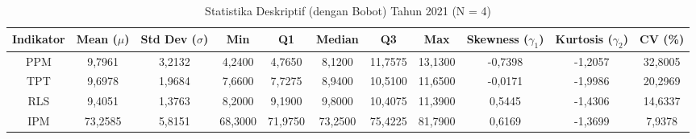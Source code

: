 \begin{table}[H]
\centering
\caption{Statistika Deskriptif (dengan Bobot) Tahun 2021 (N = 4)} \label{tab:sample1desc_2021}
\begin{adjustbox}{max width=\textwidth, max height=0.85\textheight}
\begin{tabular}{|c|c|c|c|c|c|c|c|c|c|c|}
\hline
\textbf{Indikator} & \textbf{Mean ($\mu$)} & \textbf{Std Dev ($\sigma$)} & \textbf{Min} & \textbf{Q1} & \textbf{Median} & \textbf{Q3} & \textbf{Max} & \textbf{Skewness ($\gamma_1$)} & \textbf{Kurtosis ($\gamma_2$)} & \textbf{CV (\%)} \\
\hline
PPM & 9,7961 & 3,2132 & 4,2400 & 4,7650 & 8,1200 & 11,7575 & 13,1300 & -0,7398 & -1,2057 & 32,8005 \\
TPT & 9,6978 & 1,9684 & 7,6600 & 7,7275 & 8,9400 & 10,5100 & 11,6500 & -0,0171 & -1,9986 & 20,2969 \\
RLS & 9,4051 & 1,3763 & 8,2000 & 9,1900 & 9,8000 & 10,4075 & 11,3900 & 0,5445 & -1,4306 & 14,6337 \\
IPM & 73,2585 & 5,8151 & 68,3000 & 71,9750 & 73,2500 & 75,4225 & 81,7900 & 0,6169 & -1,3699 & 7,9378 \\
\hline
\end{tabular}
\end{adjustbox}
\end{table}